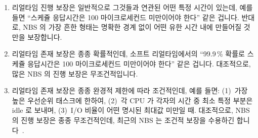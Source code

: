 \begin{enumerate}
\item	리얼타임 진행 보장은 일반적으로 그것들과 연관된 어떤 특정 시간이
	있는데, 예를 들면 ``스케쥴 응답시간은 100 마이크로세컨드 미만이어야
	한다'' 같은 겁니다.
	반대로, NBS 의 가장 흔한 형태는 명확한 경계 없이 어떤 유한 시간 내에
	만들어질 것만을 보장합니다.
\item	리얼타임 존재 보장은 종종 확률적인데, 소프트 리얼타임에서의 ``99.9\,\%
	확률로 스케쥴 응답시간은 100 마이크로세컨드 미만이어야 한다'' 같은
	겁니다.
	대조적으로, 많은 NBS 의 진행 보장은 무조건적입니다.
\item	리얼타임 존재 보장은 종종 완경적 제한에 따라 조건적인데, 예를 들면:
	(1)~가장 높은 우선순위 태스크에 한하여,
	(2)~각 CPU 가 각자의 시간 중 최소 특정 부분은 idle 로 보내며,
	(3)~I/O 비율이 어떤 명시된 최대값 미만일 때.
	대조적으로, NBS 의 진행 보장은 종종 무조건적인데, 최근의 NBS 는 조건적
	보장을 수용하긴 합니다~\cite{DanAlitarh2013PracticalProgress}.

\iffalse

\item	Real-time forward-progress guarantees usually have some
	definite time associated with them, for example,
	``scheduling latency must be less than 100 microseconds.''
	In contrast, the most popular forms of NBS only guarantees
	that progress will be made in finite time, with no definite
	bound.
\item	Real-time forward-progress guarantees are often
	probabilistic, as in the soft-real-time guarantee that
	``at least 99.9\,\% of the time, scheduling latency must
	be less than 100 microseconds.''
	In contrast, many of NBS's forward-progress guarantees are
	unconditional.
\item	Real-time forward-progress guarantees are often conditioned on
	environmental constraints, for example, only being honored:
	(1)~For the highest-priority tasks,
	(2)~When each CPU spends at least a certain fraction of its time idle,
	and (3)~When I/O rates are below some specified maximum.
	In contrast, NBS's forward-progress
	guarantees are often unconditional, although recent NBS work
	accommodates conditional
	guarantees~\cite{DanAlitarh2013PracticalProgress}.

\fi


\end{enumerate}
